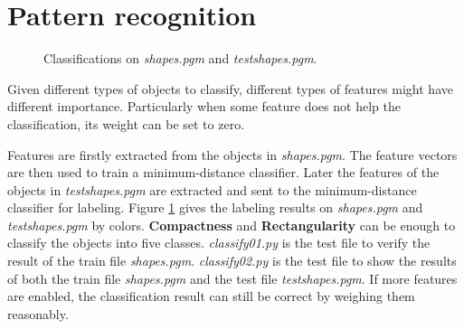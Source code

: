 \documentclass[paper=a4, fontsize=11pt]{scrartcl}
\begin{document}
\section{Pattern recognition}
\label{sec:pattern_recognition}

\begin{figure}[h]
\centering
{} 
\caption{Classifications on \emph{shapes.pgm} and \emph{testshapes.pgm}.}
\label{fig:class:01}
\end{figure}

Given different types of objects to classify, different types of features might have different importance.
Particularly when some feature does not help the classification, its weight can be set to zero. 

Features are firstly extracted from the objects in \emph{shapes.pgm}.
The feature vectors are then used to train a minimum-distance classifier.
Later the features of the objects in \emph{testshapes.pgm} are extracted and sent to the minimum-distance classifier for labeling.
Figure \ref{fig:class:01} gives the labeling results on \emph{shapes.pgm} and \emph{testshapes.pgm} by colors.
\textbf{Compactness} and \textbf{Rectangularity} can be enough to classify the objects into five classes.
\emph{classify01.py} is the test file to verify the result of the train file \emph{shapes.pgm}.
\emph{classify02.py} is the test file to show the results of both the train file \emph{shapes.pgm} and the test file \emph{testshapes.pgm}.
If more features are enabled, the classification result can still be correct by weighing them reasonably.
\end{document}

